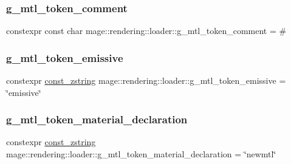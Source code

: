 \hypertarget{namespacemage_1_1rendering_1_1loader_aa434371c99d44cc729773cec213def03}{}\label{namespacemage_1_1rendering_1_1loader_aa434371c99d44cc729773cec213def03} 
\subsubsection{\texorpdfstring{g\+\_\+mtl\+\_\+token\+\_\+comment}{g\_mtl\_token\_comment}}
{\footnotesize\ttfamily constexpr const char mage\+::rendering\+::loader\+::g\+\_\+mtl\+\_\+token\+\_\+comment = \textquotesingle{}\#\textquotesingle{}}

\hypertarget{namespacemage_1_1rendering_1_1loader_ae5dfb2d3e435ce7270ab74034bb372e4}{}\label{namespacemage_1_1rendering_1_1loader_ae5dfb2d3e435ce7270ab74034bb372e4} 
\subsubsection{\texorpdfstring{g\+\_\+mtl\+\_\+token\+\_\+emissive}{g\_mtl\_token\_emissive}}
{\footnotesize\ttfamily constexpr \hyperlink{namespacemage_abfd9206dc607ceb5d13ec68bf075a5c0}{const\+\_\+zstring} mage\+::rendering\+::loader\+::g\+\_\+mtl\+\_\+token\+\_\+emissive = \char`\"{}emissive\char`\"{}}

\hypertarget{namespacemage_1_1rendering_1_1loader_a169d9aa2df11fab271c025c0937f1126}{}\label{namespacemage_1_1rendering_1_1loader_a169d9aa2df11fab271c025c0937f1126} 
\subsubsection{\texorpdfstring{g\+\_\+mtl\+\_\+token\+\_\+material\+\_\+declaration}{g\_mtl\_token\_material\_declaration}}
{\footnotesize\ttfamily constexpr \hyperlink{namespacemage_abfd9206dc607ceb5d13ec68bf075a5c0}{const\+\_\+zstring} mage\+::rendering\+::loader\+::g\+\_\+mtl\+\_\+token\+\_\+material\+\_\+declaration = \char`\"{}newmtl\char`\"{}}

